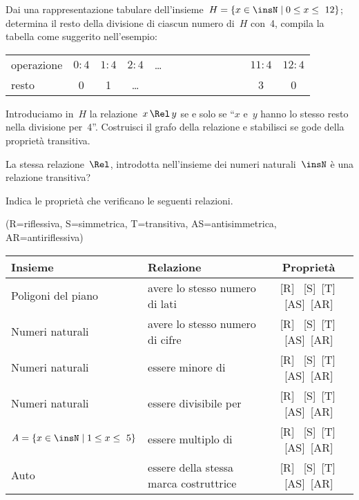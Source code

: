 \begin{esercizio}
\label{ese:7.24}
Dai una rappresentazione tabulare dell'insieme~$H = \{ x \in \insN \mid  0 \le x \le~12 \}$; determina il resto della divisione di ciascun numero di~$H$ con~4,
compila la tabella come suggerito nell'esempio:
\begin{center}
\begin{tabular}{lccccccccccccc}
\toprule
operazione & $0:4$ & $1:4$ & $2:4$ &\ldots & & & & & & & & $11:4$ & $12:4$ \\
resto & 0 & 1 &\ldots & & & & & & & & & 3 & 0 \\
\bottomrule
\end{tabular}
\end{center}
Introduciamo in~$H$ la relazione~$x \,\Rel\, y$ se e solo se ``$x$ e~$y$ hanno lo stesso resto nella divisione per~4''.
Costruisci il grafo della relazione e stabilisci se gode della proprietà transitiva.

La stessa relazione~$\Rel$, introdotta nell'insieme dei numeri naturali~$\insN$ è una relazione transitiva?
\end{esercizio}

\begin{esercizio}
\label{ese:7.25}
Indica le proprietà che verificano le seguenti relazioni.
\begin{center}
(R=riflessiva, S=simmetrica, T=transitiva, AS=antisimmetrica, AR=antiriflessiva)

\begin{tabular}{llc}
\toprule
Insieme & Relazione & Proprietà\\
\midrule
Poligoni del piano & avere lo stesso numero di lati & [R] \, [S]\, [T]\, [AS]\, [AR] \\
Numeri naturali & avere lo stesso numero di cifre & [R] \, [S]\, [T]\, [AS]\, [AR] \\
Numeri naturali & essere minore di & [R] \, [S]\, [T]\, [AS]\, [AR] \\
Numeri naturali & essere divisibile per & [R] \, [S]\, [T]\, [AS]\, [AR] \\
$A = \{ x \in \insN \mid  1 \le x \le~5 \}$ & essere multiplo di & [R] \, [S]\, [T]\, [AS]\, [AR] \\
Auto & essere della stessa marca costruttrice & [R] \, [S]\, [T]\, [AS]\, [AR] \\
\bottomrule
\end{tabular}
\end{center}
\end{esercizio}

